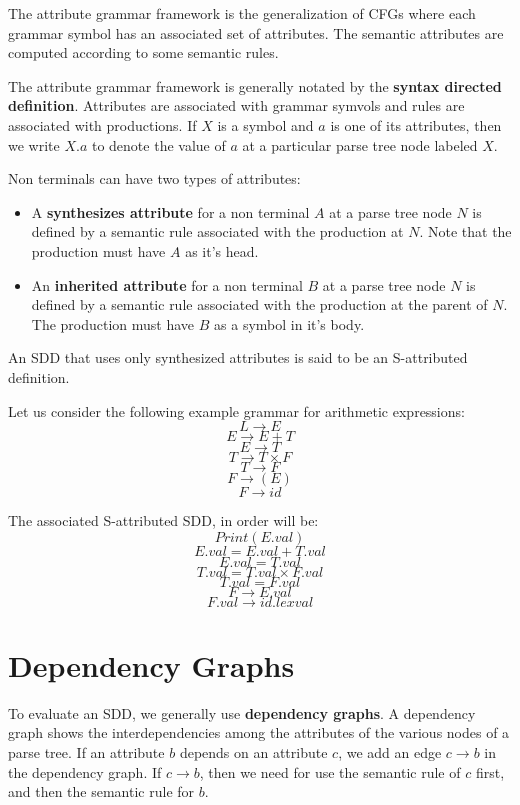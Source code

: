 \documentclass[12pt,letterpaper]{book}
\theoremstyle{definition}
\begin{document}
The attribute grammar framework is the generalization of CFGs where each grammar symbol has an associated set of attributes. The semantic attributes are computed according to some semantic rules.

The attribute grammar framework is generally notated by the \textbf{syntax directed definition}. Attributes are associated with grammar symvols and rules are associated with productions. If $X$ is a symbol and $a$ is one of its attributes, then we write $X.a$ to denote the value of $a$ at a particular parse tree node labeled $X$.

Non terminals can have two types of attributes:

\begin{itemize}
  \item A \textbf{synthesizes attribute} for a non terminal $A$ at a parse tree node $N$ is defined by a semantic rule associated with the production at $N$. Note that the production must have $A$ as it's head.
  \item An \textbf{inherited attribute} for a non terminal $B$ at a parse tree node $N$ is defined by a semantic rule associated with the production at the parent of $N$. The production must have $B$ as a symbol in it's body.
\end{itemize}

An SDD that uses only synthesized attributes is said to be an S-attributed definition.

Let us consider the following example grammar for arithmetic expressions:
\[L \rightarrow E\]
\[E \rightarrow E + T\]
\[E \rightarrow T\]
\[T \rightarrow T \times F\]
\[T \rightarrow F\]
\[F \rightarrow (E)\]
\[F \rightarrow id\]

The associated S-attributed SDD, in order will be:
\[Print(E.val)\]
\[E.val = E.val + T.val\]
\[E.val = T.val\]
\[T.val = T.val \times F.val\]
\[T.val = F.val\]
\[F \rightarrow E.val\]
\[F.val \rightarrow id.lexval\]

\section{Dependency Graphs}

To evaluate an SDD, we generally use \textbf{dependency graphs}. A dependency graph shows the interdependencies among the attributes of the various nodes of a parse tree. If an attribute $b$ depends on an attribute $c$, we add an edge $c \rightarrow b$ in the dependency graph. If $c \rightarrow b$, then we need for use the semantic rule of $c$ first, and then the semantic rule for $b$.
\end{document}
